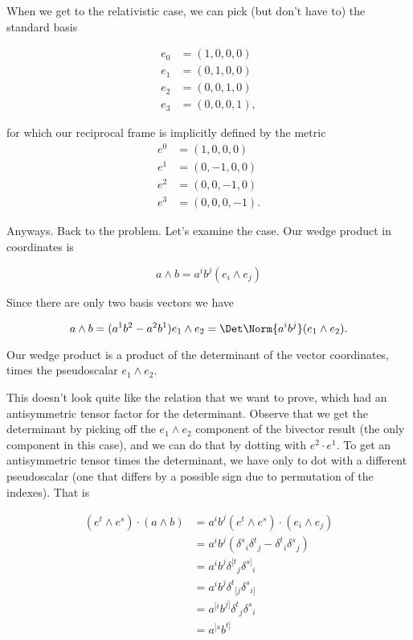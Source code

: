 When we get to the relativistic case, we can pick (but don't have to) the standard basis

\begin{align}\label{eqn:relElectroDynProblemSet3:330}
e_0 &= (1, 0, 0, 0) \\
e_1 &= (0, 1, 0, 0) \\
e_2 &= (0, 0, 1, 0) \\
e_3 &= (0, 0, 0, 1),
\end{align}

for which our reciprocal frame is implicitly defined by the metric
\begin{align}\label{eqn:relElectroDynProblemSet3:350}
e^0 &= (1, 0, 0, 0) \\
e^1 &= (0, -1, 0, 0) \\
e^2 &= (0, 0, -1, 0) \\
e^3 &= (0, 0, 0, -1).
\end{align}

Anyways.  Back to the problem.  Let's examine the  case.  Our wedge product in coordinates is

\begin{equation}\label{eqn:relElectroDynProblemSet3:370}
a \wedge b
=
a^i b^j (e_i \wedge e_j)
\end{equation}

Since there are only two basis vectors we have

\begin{equation}\label{eqn:relElectroDynProblemSet3:390}
a \wedge b
=
(a^1 b^2 - a^2 b^1) e_1 \wedge e_2 = \Det \Norm{a^i b^j} (e_1 \wedge e_2).
\end{equation}

Our wedge product is a product of the determinant of the vector coordinates, times the  pseudoscalar $e_1 \wedge e_2$.

This doesn't look quite like the  relation that we want to prove, which had an antisymmetric tensor factor for the determinant.  Observe that we get the determinant by picking off the $e_1 \wedge e_2$ component of the bivector result (the only component in this case), and we can do that by dotting with $e^2 \cdot e^1$.  To get an antisymmetric tensor times the determinant, we have only to dot with a different pseudoscalar (one that differs by a possible sign due to permutation of the indexes).  That is

\begin{align*}
(e^t \wedge e^s) \cdot (a \wedge b)
&=
a^i b^j (e^t \wedge e^s) \cdot (e_i \wedge e_j) \\
&=
a^i b^j 
\left( {\delta^{s}}_i {\delta^{t}}_j 
-{\delta^{t}}_i {\delta^{s}}_j  \right) \\
&=
a^i b^j 
{\delta^{[t}}_j {\delta^{s]}}_i \\
&=
a^i b^j 
{\delta^{t}}_{[j} {\delta^{s}}_{i]} \\
&=
a^{[i} b^{j]}
{\delta^{t}}_{j} {\delta^{s}}_{i} \\
&=
a^{[s} b^{t]}
\end{align*}


